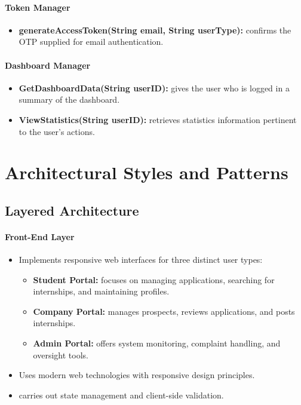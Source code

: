 \paragraph{Token Manager}
\begin{itemize}
    \item \textbf{generateAccessToken(String email, String userType):} confirms the OTP supplied for email authentication.
\end{itemize}

\paragraph{Dashboard Manager}
\begin{itemize}
    \item \textbf{GetDashboardData(String userID):} gives the user who is logged in a summary of the dashboard.
    \item \textbf{ViewStatistics(String userID):} retrieves statistics information pertinent to the user's actions.
\end{itemize}

\section{Architectural Styles and Patterns}
\label{subsec:architectural_styles_patterns}

\subsection{Layered Architecture}
\paragraph{Front-End Layer}
\begin{itemize}
    \item Implements responsive web interfaces for three distinct user types:
    \begin{itemize}
        \item \textbf{Student Portal:} focuses on managing applications, searching for internships, and maintaining profiles.
        \item \textbf{Company Portal:} manages prospects, reviews applications, and posts internships.
        \item \textbf{Admin Portal:} offers system monitoring, complaint handling, and oversight tools.
    \end{itemize}
    \item Uses modern web technologies with responsive design principles.
    \item carries out state management and client-side validation.
\end{itemize}

